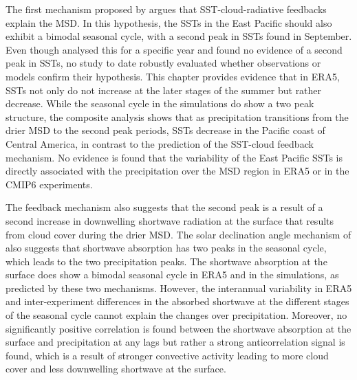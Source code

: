  The first mechanism proposed by \cite{magana1999} argues that SST-cloud-radiative feedbacks explain the MSD. In this hypothesis, the SSTs in the East Pacific should also exhibit a bimodal seasonal cycle, with a second peak in SSTs found in September. Even though \cite{magana2005} analysed this for a specific year and found no evidence of a second peak in SSTs, no study to date robustly evaluated whether observations or models confirm their hypothesis. This chapter provides evidence that in ERA5, SSTs not only do not increase at the later stages of the summer but rather decrease. While the seasonal cycle in the simulations do show a two peak structure, the composite analysis shows that as precipitation transitions from the drier MSD to the second peak periods, SSTs decrease in the Pacific coast of Central America, in contrast to the prediction of the SST-cloud feedback mechanism. No evidence is found that the variability of the East Pacific SSTs is directly associated with the precipitation over the MSD region in ERA5 or in the CMIP6 experiments. 

 
The feedback mechanism also suggests that the second peak is a result of a second increase in downwelling shortwave radiation at the surface that results from cloud cover during the drier MSD.
The solar declination angle mechanism of \cite{karnauskas2013} also suggests that shortwave absorption has two peaks in the seasonal cycle, which leads to the two precipitation peaks. The shortwave absorption at the surface does show a bimodal seasonal cycle in ERA5 and in the simulations, as predicted by these two mechanisms. However, the interannual variability in ERA5 and inter-experiment differences in the absorbed shortwave at the different stages of the seasonal cycle cannot explain the changes over precipitation. Moreover, no significantly positive correlation is found between the shortwave absorption at the surface and precipitation at any lags but rather a strong anticorrelation signal is found, which is a result of stronger convective activity leading to more cloud cover and less downwelling shortwave at the surface.

